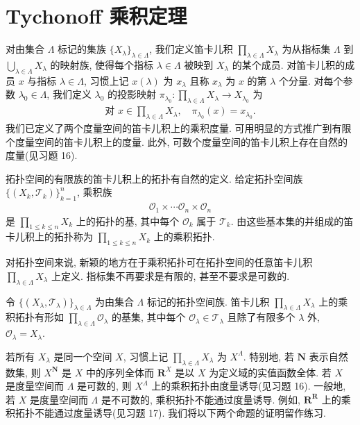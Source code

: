 \documentclass[../../main.tex]{subfiles}
\begin{document}
\section{Tychonoff 乘积定理}\label{section:ch12-Tychonoff}

对由集合 $\Lambda$ 标记的集族 $\{X_{\lambda}\}_{\lambda\in\Lambda}$, 我们定义笛卡儿积 $\prod_{\lambda\in\Lambda}X_{\lambda}$ 为从指标集 $\Lambda$ 到 $\bigcup_{\lambda\in\Lambda}X_{\lambda}$ 的映射族, 使得每个指标 $\lambda\in\Lambda$ 被映到 $X_{\lambda}$ 的某个成员. 对笛卡儿积的成员 $x$ 与指标 $\lambda\in\Lambda$, 习惯上记 $x(\lambda)$ 为 $x_{\lambda}$ 且称 $x_{\lambda}$ 为 $x$ 的第 $\lambda$ 个分量. 对每个参数 $\lambda_{0}\in\Lambda$, 我们定义 $\lambda_{0}$ 的投影映射 $\pi_{\lambda_{0}}:\prod_{\lambda\in\Lambda}X_{\lambda}\to X_{\lambda_{0}}$ 为
\begin{align*}
\text{对 }x\in\prod_{\lambda\in\Lambda}X_{\lambda},\quad\pi_{\lambda_{0}}(x)=x_{\lambda_{0}}.
\end{align*}
我们已定义了两个度量空间的笛卡儿积上的乘积度量. 可用明显的方式推广到有限个度量空间的笛卡儿积上的度量. 此外, 可数个度量空间的笛卡儿积上存在自然的度量(见习题 16).

拓扑空间的有限族的笛卡儿积上的拓扑有自然的定义. 给定拓扑空间族 $\{(X_{k},\mathcal{T}_{k})\}_{k=1}^{n}$, 乘积族
\begin{align*}
\mathcal{O}_{1}\times\cdots\mathcal{O}_{n}\times\mathcal{O}_{n}
\end{align*}
是 $\prod_{1\leqslant k\leqslant n}X_{k}$ 上的拓扑的基, 其中每个 $\mathcal{O}_{k}$ 属于 $\mathcal{T}_{k}$. 由这些基本集的并组成的笛卡儿积上的拓扑称为 $\prod_{1\leqslant k\leqslant n}X_{k}$ 上的乘积拓扑.

对拓扑空间来说, 新颖的地方在于乘积拓扑可在拓扑空间的任意笛卡儿积 $\prod_{\lambda\in\Lambda}X_{\lambda}$ 上定义. 指标集不再要求是有限的, 甚至不要求是可数的.

\begin{definition}[乘积拓扑]\label{definition:ch12-乘积拓扑}
令 $\{(X_{\lambda},\mathcal{T}_{\lambda})\}_{\lambda\in\Lambda}$ 为由集合 $\Lambda$ 标记的拓扑空间族. 笛卡儿积 $\prod_{\lambda\in\Lambda}X_{\lambda}$ 上的乘积拓扑有形如 $\prod_{\lambda\in\Lambda}\mathcal{O}_{\lambda}$ 的基集, 其中每个 $\mathcal{O}_{\lambda}\in\mathcal{T}_{\lambda}$ 且除了有限多个 $\lambda$ 外, $\mathcal{O}_{\lambda}=X_{\lambda}$.
\end{definition}

若所有 $X_{\lambda}$ 是同一个空间 $X$, 习惯上记 $\prod_{\lambda\in\Lambda}X_{\lambda}$ 为 $X^{\Lambda}$. 特别地, 若 $\mathbf{N}$ 表示自然数集, 则 $X^{\mathbf{N}}$ 是 $X$ 中的序列全体而 $\mathbf{R}^{X}$ 是以 $X$ 为定义域的实值函数全体. 若 $X$ 是度量空间而 $\Lambda$ 是可数的, 则 $X^{\Lambda}$ 上的乘积拓扑由度量诱导(见习题 16). 一般地, 若 $X$ 是度量空间而 $\Lambda$ 是不可数的, 乘积拓扑不能通过度量诱导. 例如, $\mathbf{R}^{\mathbf{R}}$ 上的乘积拓扑不能通过度量诱导(见习题 17). 我们将以下两个命题的证明留作练习.
\end{document}
